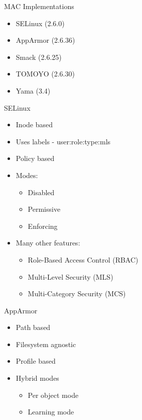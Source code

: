 \documentclass{curs}
\begin{document}
\begin{frame}{MAC Implementations}
  \begin{itemize}
    \item SELinux (2.6.0)
    \item AppArmor (2.6.36)
    \item Smack (2.6.25)
    \item TOMOYO (2.6.30)
    \item Yama (3.4)
  \end{itemize}
\end{frame}


\begin{frame}{SELinux}
  \begin{itemize}
    \item Inode based
    \item Uses labels - user:role:type:mls
    \item Policy based
    \item Modes:
      \begin{itemize}
        \item Disabled
        \item Permissive
        \item Enforcing
      \end{itemize}
    \item Many other features:
      \begin{itemize}
        \item Role-Based Access Control (RBAC)
        \item Multi-Level Security (MLS)
        \item Multi-Category Security (MCS)
      \end{itemize}
  \end{itemize}
\end{frame}


\begin{frame}{AppArmor}
  \begin{itemize}
    \item Path based
    \item Filesystem agnostic
    \item Profile based
    \item Hybrid modes
    \begin{itemize}
      \item Per object mode
      \item Learning mode
    \end{itemize}
  \end{itemize}
\end{frame}
\end{document}

